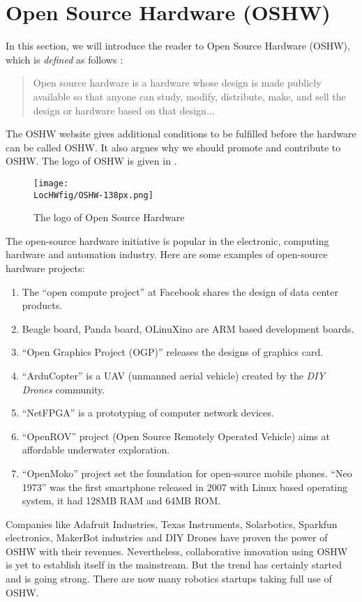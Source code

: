 \section{Open Source Hardware (OSHW)}
\label{sec:oshw}
In this section, we will introduce the reader to Open Source Hardware
(OSHW), which is
\emph{defined} as follows \cite{oshw-ref}:
\begin{quote}
  Open source hardware is a hardware whose design is made publicly
  available so that anyone can study, modify, distribute, make, and sell
  the design or hardware based on that design...
\end{quote}
The OSHW website \cite{oshw-ref} gives additional conditions to be
fulfilled before the hardware can be called OSHW.  It also argues why
we should promote and contribute to OSHW.  The logo of OSHW is given
in  \cite{OSHW-logo-ref}.
\begin{figure}
  \centering
  \texttt{[image: \\LocHWfig/OSHW-138px.png]}
  \caption{The logo of Open Source Hardware}
  \label{fig:OSHW-logo}
\end{figure}
The open-source hardware initiative is popular in the electronic,
computing hardware and automation industry.  Here are some examples of
open-source hardware projects:
\begin{enumerate}
  \item The ``open compute project'' at Facebook shares the design of
        data center products.
  \item Beagle board, Panda board, OLinuXino are ARM based development
        boards.
  \item ``Open Graphics Project (OGP)'' releases the designs of
        graphics card.
  \item ``ArduCopter'' is a UAV (unmanned aerial vehicle) created by
        the \emph{DIY Drones} community.
  \item ``NetFPGA'' is a prototyping of computer network devices.
  \item ``OpenROV'' project (Open Source Remotely Operated Vehicle)
        aims at affordable underwater exploration.
  \item ``OpenMoko'' project set the foundation for open-source mobile
        phones. ``Neo 1973'' was the first smartphone released in 2007
        with Linux based operating system, it had 128MB RAM and 64MB ROM.
\end{enumerate}

Companies like Adafruit Industries, Texas Instruments, Solarbotics,
Sparkfun electronics, MakerBot industries and DIY Drones have proven
the power of OSHW with their revenues.  Nevertheless, collaborative
innovation using OSHW is yet to establish itself in the mainstream.  But
the trend has certainly started and is going strong.  There are now
many robotics startups taking full use of OSHW.

